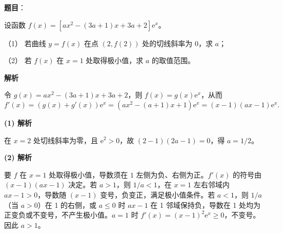 \begin{answer}

\textbf{题目}：

设函数 $f(x)=[ax^2-(3a+1)x+3a+2]\mathrm e^x$。

（1） 若曲线 $y=f(x)$ 在点 $(2,f(2))$ 处的切线斜率为 $0$，求 $a$；

（2） 若 $f(x)$ 在 $x=1$ 处取得极小值，求 $a$ 的取值范围。

\textbf{解析}

令 $g(x)=ax^2-(3a+1)x+3a+2$，则 $f(x)=g(x)\mathrm e^x$，从而
\nopagebreak[4]
\[
f'(x)=(g(x)+g'(x))\mathrm e^x=(ax^2-(a+1)x+1)\mathrm e^x=(x-1)(ax-1)\mathrm e^x.
\]

\textbf{(1) 解析}

在 $x=2$ 处切线斜率为零，且 $\mathrm e^2>0$，故 $(2-1)(2a-1)=0$，得 $a=1/2$。

\textbf{(2) 解析}

要 $f$ 在 $x=1$ 处取得极小值，导数须在 $1$ 左侧为负、右侧为正。$f'(x)$ 的符号由 $(x-1)(ax-1)$ 决定。若 $a>1$，则 $1/a<1$，在 $x=1$ 左右邻域内 $ax-1>0$，导数随 $(x-1)$ 变号，负变正，满足极小值条件。若 $a<1$，则 $1/a$（当 $a>0$）在 1 的右侧，或 $a\le0$ 时 $ax-1$ 在 1 邻域保持负，导数在 1 处均为正变负或不变号，不产生极小值。$a=1$ 时 $f'(x)=(x-1)^2\mathrm e^x\ge0$，不变号。因此 $a>1$。



\end{answer}
